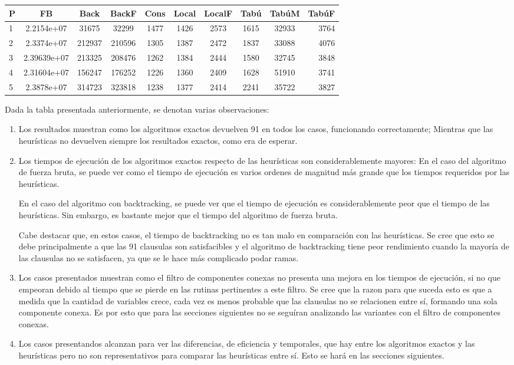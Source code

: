 \documentclass[a4paper,10pt]{article}
\begin{document}
\medskip
\begin{tabular}{||l|c|c|c|c|c|c|c|c|r||}
\hline
\hline
P & FB & Back & BackF & Cons & Local & LocalF & Tab\'u & Tab\'uM & Tab\'uF\\
\hline
1 & 2.2154e+07 & 31675 & 32299 & 1477 & 1426 & 2573 & 1615 & 32933 & 3764\\
\hline
2 & 2.3374e+07 & 212937 & 210596 & 1305 & 1387 & 2472 & 1837 & 33088 & 4076 \\
\hline
3 & 2.39639e+07 & 213325 & 208476 & 1262 & 1384 & 2444 & 1580 & 32745 & 3848\\ 
\hline
4 & 2.31604e+07 & 156247 & 176252 & 1226 & 1360 & 2409 & 1628 & 51910 & 3741\\
\hline
5 & 2.3878e+07 & 314723 & 323818 & 1238 & 1377  & 2414 & 2241 & 35722 & 3827\\
\hline
\hline
\end{tabular}
\medskip


Dada la tabla presentada anteriormente, se denotan varias observaciones:

\begin{enumerate}
\item Los resultados muestran como los algoritmos exactos devuelven 91 en todos los casos, funcionando correctamente; Mientras que las heur\'isticas no devuelven siempre los resultados exactos, como era de esperar.
\item Los tiempos de ejecuci\'on de los algoritmos exactos respecto de las heur\'isticas son considerablemente mayores: En el caso del algoritmo de fuerza bruta, se puede ver como el tiempo de ejecuci\'on es varios ordenes de magnitud m\'as grande que los tiempos requeridos por las heur\'isticas.

En el caso del algoritmo con backtracking, se puede ver que el tiempo de ejecuci\'on es considerablemente peor que el tiempo de las heur\'isticas. Sin embargo, es bastante mejor que el tiempo del algoritmo de fuerza bruta.

Cabe destacar que, en estos casos, el tiempo de backtracking no es tan malo en comparaci\'on con las heur\'isticas. Se cree que esto se debe principalmente a que las 91 clausulas son satisfacibles y el algoritmo de backtracking tiene peor rendimiento cuando la mayor\'ia de las clausulas no se satisfacen, ya que se le hace m\'as complicado podar ramas.
\item Los casos presentados muestran como el filtro de componentes conexas no presenta una mejora en los tiempos de ejecuci\'on, si no que empeoran debido al tiempo que se pierde en las rutinas pertinentes a este filtro. Se cree que la razon para que suceda esto es que a medida que la cantidad de variables crece, cada vez es menos probable que las clausulas no se relacionen entre s\'i, formando una sola componente conexa. Es por esto que para las secciones siguientes no se segu\'iran analizando las variantes con el filtro de componentes conexas.
\item Los casos presentandos alcanzan para ver las diferencias, de eficiencia y temporales, que hay entre los algoritmos exactos y las heur\'isticas pero no son representativos para comparar las heur\'isticas entre s\'i. Esto se har\'a en las secciones siguientes.
\end{enumerate}
\end{document}
